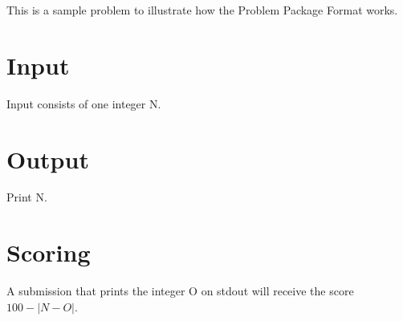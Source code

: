 This is a sample problem to illustrate how the Problem Package Format works.
\section*{Input}
Input consists of one integer N.
\section*{Output}
Print N.
\section*{Scoring}
A submission that prints the integer O on stdout will receive the score $ 100 - \lvert N - O\rvert $.
